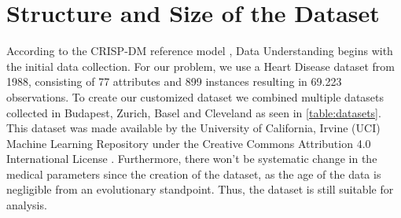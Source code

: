 \section{Structure and Size of the Dataset} \label{sec:dataUnderstanding}


According to the CRISP-DM reference model \citep{chapman2000}, Data Understanding begins with the initial data collection. For our problem, we use a Heart Disease dataset from 1988, consisting of 77 attributes and 899 instances resulting in 69.223 observations. To create our customized dataset we combined multiple datasets collected in Budapest, Zurich, Basel and Cleveland as seen in \cref{table:datasets}. This dataset was made available by the University of California, Irvine (UCI) Machine Learning Repository under the Creative Commons Attribution 4.0 International License \citep{janosi1988}. Furthermore, there won't be systematic change in the medical parameters since the creation of the dataset, as the age of the data is negligible from an evolutionary standpoint. Thus, the dataset is still suitable for analysis.

